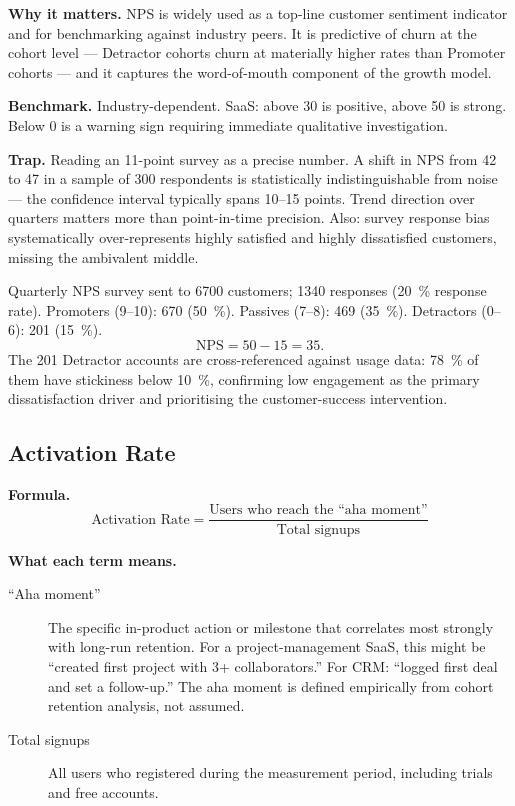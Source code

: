 \textbf{Why it matters.} NPS is widely used as a top-line customer sentiment indicator and
for benchmarking against industry peers. It is predictive of churn at the cohort level ---
Detractor cohorts churn at materially higher rates than Promoter cohorts --- and it
captures the word-of-mouth component of the growth model.

\textbf{Benchmark.} Industry-dependent. SaaS: above 30 is positive, above 50 is strong.
Below 0 is a warning sign requiring immediate qualitative investigation.

\textbf{Trap.} Reading an 11-point survey as a precise number. A shift in NPS from 42 to 47
in a sample of 300 respondents is statistically indistinguishable from noise --- the
confidence interval typically spans 10--15 points. Trend direction over quarters matters
more than point-in-time precision. Also: survey response bias systematically over-represents
highly satisfied and highly dissatisfied customers, missing the ambivalent middle.

\begin{example}
Quarterly NPS survey sent to \num{6700} customers; \num{1340} responses (\qty{20}{\percent}
response rate). Promoters (9--10): 670 (\qty{50}{\percent}). Passives (7--8): 469
(\qty{35}{\percent}). Detractors (0--6): 201 (\qty{15}{\percent}).
\[
  \mathrm{NPS} = 50 - 15 = 35.
\]
The 201 Detractor accounts are cross-referenced against usage data: \qty{78}{\percent} of
them have stickiness below \qty{10}{\percent}, confirming low engagement as the primary
dissatisfaction driver and prioritising the customer-success intervention.
\end{example}


\subsection{Activation Rate}

\textbf{Formula.}
\[
  \text{Activation Rate} = \frac{\text{Users who reach the ``aha moment''}}{\text{Total signups}}
\]

\textbf{What each term means.}
\begin{description}
  \item[``Aha moment''] The specific in-product action or milestone that correlates most
    strongly with long-run retention. For a project-management SaaS, this might be
    ``created first project with 3+ collaborators.'' For CRM: ``logged first deal and set
    a follow-up.'' The aha moment is defined empirically from cohort retention analysis, not
    assumed.
  \item[Total signups] All users who registered during the measurement period, including
    trials and free accounts.
\end{description}

